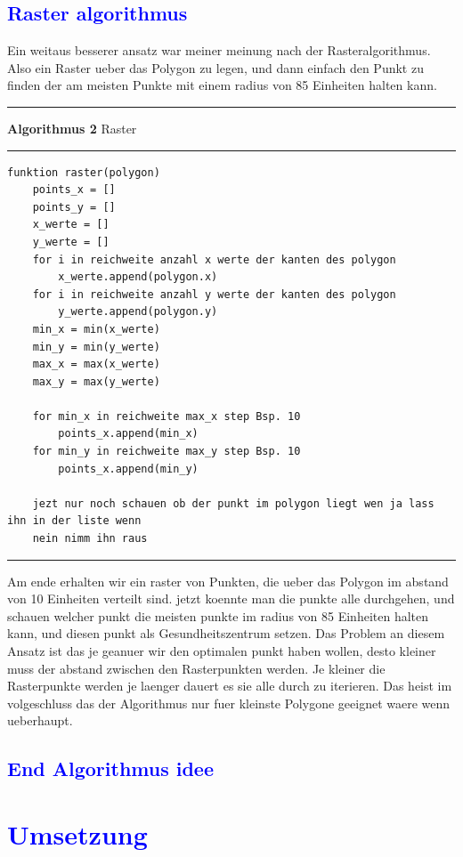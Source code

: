 \documentclass{article}
\begin{document}
\subsection{\textcolor{blue}{Raster algorithmus}}
Ein weitaus besserer ansatz war meiner meinung nach der Rasteralgorithmus. Also ein Raster ueber das Polygon zu legen, und dann einfach den Punkt zu finden der am meisten Punkte mit einem radius von 85 Einheiten halten kann.
\vspace{5pt}
\hrule
\vspace{1.5pt}
\large{\textbf{Algorithmus 2} Raster}
\vspace{1.5pt}
\hrule
\begin{verbatim}
funktion raster(polygon)
	points_x = []
	points_y = []
	x_werte = []
	y_werte = []
	for i in reichweite anzahl x werte der kanten des polygon
		x_werte.append(polygon.x)
	for i in reichweite anzahl y werte der kanten des polygon
		y_werte.append(polygon.y)
	min_x = min(x_werte)
	min_y = min(y_werte)
	max_x = max(x_werte)
	max_y = max(y_werte)
	
	for min_x in reichweite max_x step Bsp. 10
		points_x.append(min_x)
	for min_y in reichweite max_y step Bsp. 10
		points_x.append(min_y)
		
	jezt nur noch schauen ob der punkt im polygon liegt wen ja lass ihn in der liste wenn
	nein nimm ihn raus 
\end{verbatim}
\hrule
\vspace{5pt}
Am ende erhalten wir ein raster von Punkten, die ueber das Polygon im abstand von 10 Einheiten verteilt sind. jetzt koennte man die punkte alle durchgehen, und schauen welcher punkt die meisten punkte im radius von 85 Einheiten halten kann, und diesen punkt als Gesundheitszentrum setzen. Das Problem an diesem Ansatz ist das je geanuer wir den optimalen punkt haben wollen, desto kleiner muss der abstand zwischen den Rasterpunkten werden. Je kleiner die Rasterpunkte werden je laenger dauert es sie alle durch zu iterieren. Das heist im volgeschluss das der Algorithmus nur fuer kleinste Polygone geeignet waere wenn ueberhaupt.

\subsection{\textcolor{blue}{End Algorithmus idee}}

\section{\textcolor{blue}{Umsetzung}}
\end{document}
